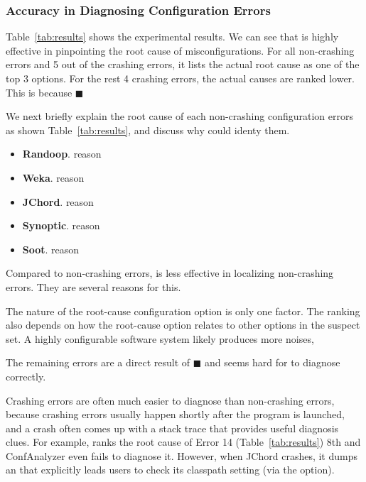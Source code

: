 \subsubsection{Accuracy in Diagnosing Configuration Errors}

Table~\ref{tab:results} shows the experimental results.
We can see that \ourtool is highly effective in pinpointing the root cause of
misconfigurations. For all \noncrash non-crashing errors
and 5 out of the \crash crashing errors, it lists the actual root cause as one of the
top 3 options. For the rest
4 crashing errors, the actual causes are ranked lower.
This is because $\blacksquare$


We next briefly explain the root cause of each non-crashing configuration
errors as shown Table~\ref{tab:results}, and discuss why
\ourtool could identy them. 

\begin{itemize}
\item \textbf{Randoop}. reason
\item \textbf{Weka}. reason
\item \textbf{JChord}. reason
\item \textbf{Synoptic}. reason
\item \textbf{Soot}. reason
\end{itemize}

Compared to non-crashing errors, \ourtool is less effective
in localizing non-crashing errors. They are several reasons
for this.

The nature of the root-cause configuration option is only one factor.
The ranking also depends on how the root-cause option relates to
other options in the suspect set. A highly configurable software system 
likely produces more noises, 


The remaining errors are a direct result of $\blacksquare$ and seems
hard for \ourtool to diagnose correctly.



Crashing errors are often much easier to diagnose than non-crashing errors,
because crashing errors usually happen shortly after the program
is launched, and a crash often comes up with a stack trace that provides
useful diagnosis clues. For example, \ourtool ranks the root cause of
Error 14 (Table~\ref{tab:results}) 8th and ConfAnalyzer even fails to diagnose it.
However, when JChord crashes, it dumps an 
that explicitly leads users to check its classpath setting (via the
 option).


